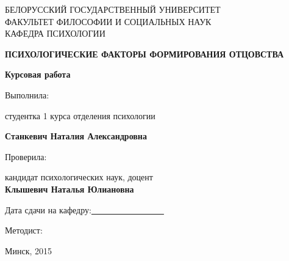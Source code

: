 \documentclass{../../common/thesisbyxetex}
\begin{document}

\begin{titlepage}
\newpage

\begin{center}
\large \uppercase{Белорусский государственный университет \\
факультет философии и социальных наук\\
кафедра психологии}
\end{center}
 
\vspace{12em}



\begin{center}
\Large \uppercase{\textbf{Психологические факторы формирования отцовства}}
\end{center}

\begin{center}
\textbf{Курсовая работа}
\end{center}

\vspace{11em}
 
\begin{flushright}
Выполнила:

\vspace{0.25em}

студентка 1 курса отделения психологии

\textbf{Станкевич Наталия Александровна}

\vspace{2em}

Проверила:

\vspace{0.25em}

кандидат психологических наук, доцент \\

\textbf{Клышевич Наталья Юлиановна}

\end{flushright}

\vspace{2em}
Дата сдачи на кафедру:\underline{~~~~~~~~~~~~~~~~~}
\vspace{0.25em}

Методист:
 
\vspace{\fill}

\begin{center}
Минск, 2015
\end{center}

\end{titlepage} 
 
\end{document}
